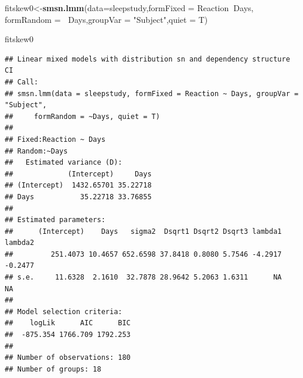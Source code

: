 \documentclass[
  ignorenonframetext,
]{beamer}
\newenvironment{Shaded}{\begin{snugshade}}{\end{snugshade}}
\newcommand{\DataTypeTok}[1]{\textcolor[rgb]{0.13,0.29,0.53}{#1}}
\newcommand{\KeywordTok}[1]{\textcolor[rgb]{0.13,0.29,0.53}{\textbf{#1}}}
\newcommand{\NormalTok}[1]{#1}
\newcommand{\OperatorTok}[1]{\textcolor[rgb]{0.81,0.36,0.00}{\textbf{#1}}}
\newcommand{\StringTok}[1]{\textcolor[rgb]{0.31,0.60,0.02}{#1}}
\begin{document}
\begin{frame}[fragile]

\tiny

\begin{Shaded}
\begin{Highlighting}[]
\NormalTok{fitskew0<-}\KeywordTok{smsn.lmm}\NormalTok{(}\DataTypeTok{data=}\NormalTok{sleepstudy,}\DataTypeTok{formFixed =}\NormalTok{ Reaction}\OperatorTok{~}\NormalTok{Days,}
              \DataTypeTok{formRandom =} \OperatorTok{~}\NormalTok{Days,}\DataTypeTok{groupVar =} \StringTok{"Subject"}\NormalTok{,}\DataTypeTok{quiet =}\NormalTok{ T)}
\end{Highlighting}
\end{Shaded}

\begin{Shaded}
\begin{Highlighting}[]
\NormalTok{fitskew0}
\end{Highlighting}
\end{Shaded}

\begin{verbatim}
## Linear mixed models with distribution sn and dependency structure CI 
## Call:
## smsn.lmm(data = sleepstudy, formFixed = Reaction ~ Days, groupVar = "Subject", 
##     formRandom = ~Days, quiet = T)
## 
## Fixed:Reaction ~ Days
## Random:~Days
##   Estimated variance (D):
##             (Intercept)     Days
## (Intercept)  1432.65701 35.22718
## Days           35.22718 33.76855
## 
## Estimated parameters:
##      (Intercept)    Days   sigma2  Dsqrt1 Dsqrt2 Dsqrt3 lambda1 lambda2
##         251.4073 10.4657 652.6598 37.8418 0.8080 5.7546 -4.2917 -0.2477
## s.e.     11.6328  2.1610  32.7878 28.9642 5.2063 1.6311      NA      NA
## 
## Model selection criteria:
##    logLik      AIC      BIC
##  -875.354 1766.709 1792.253
## 
## Number of observations: 180 
## Number of groups: 18
\end{verbatim}

\end{frame}
\end{document}
